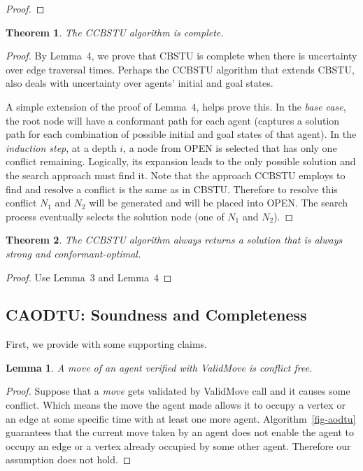 \documentclass{article}
\newtheorem{theorem}{Theorem}
\newtheorem{lemma}{Lemma}
\begin{document}
{\begin{proof}
\end{proof}

\begin{theorem}
The CCBSTU algorithm is  complete.
\end{theorem}
\begin{proof}
By Lemma~4, we prove that CBSTU is complete when there is uncertainty over edge traversal times. Perhaps the CCBSTU algorithm that extends CBSTU, also deals with uncertainty over agents' initial and goal states.

A simple extension of the proof of Lemma~4, helps prove this. In the \emph{base case}, the root node will have a conformant path for each agent (captures a solution path for each combination of possible initial and goal states of that agent).
In the \emph{induction step}, at a depth $i$, a node from OPEN is selected that has only one conflict remaining. Logically, its expansion leads to the only possible solution and the search approach must find it.  
Note that the approach CCBSTU employs to find and resolve a conflict is the same as in CBSTU. 
Therefore to resolve this conflict $N_1$ and $N_2$ will be generated and will be placed into OPEN. The search process eventually selects the solution node (one of $N_1$ and $N_2$).
\end{proof}
%
\begin{theorem}
The CCBSTU algorithm always returns a solution that is always strong and conformant-optimal.
\end{theorem}
\begin{proof}
Use Lemma~3 and Lemma~4
\end{proof}

\subsection{CAODTU: Soundness and Completeness}
First, we provide with some supporting claims.
\begin{lemma}
A move of an agent verified with ValidMove is conflict free.    
\end{lemma}
\begin{proof}
Suppose that a \emph{move} gets validated by ValidMove call and it causes some conflict. Which means the move the agent made allows it to occupy a vertex or an edge at some specific time with at least one more agent. 
Algorithm~\ref{fig-aodtu} guarantees that the current move taken by an agent does not enable the agent to occupy an edge or a vertex already occupied by some other agent. Therefore our assumption does not hold.  
\end{proof}

}
\end{document}
